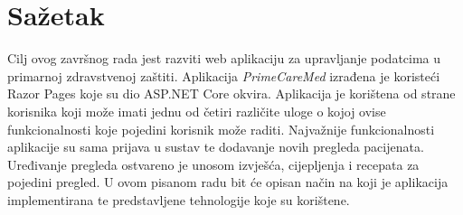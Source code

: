\section*{Sažetak}
\label{sec:summary}
Cilj ovog završnog rada jest razviti web aplikaciju za upravljanje podatcima u primarnoj zdravstvenoj zaštiti. Aplikacija \textit{PrimeCareMed} izrađena je koristeći Razor Pages koje su dio ASP.NET Core okvira. Aplikacija je korištena od strane korisnika koji može imati jednu od četiri različite uloge o kojoj ovise funkcionalnosti koje pojedini korisnik može raditi. Najvažnije funkcionalnosti aplikacije su sama prijava u sustav te dodavanje novih pregleda pacijenata. Uređivanje pregleda ostvareno je unosom izvješća, cijepljenja i recepata za pojedini pregled. U ovom pisanom radu bit će opisan način na koji je aplikacija implementirana te predstavljene tehnologije koje su korištene.
